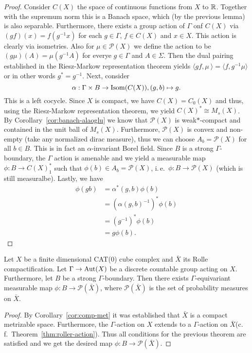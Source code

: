 \begin{proof}
  Consider \(C(X)\) the space of continuous functions from \(X\) to \(\mathbb{R}\). Together with the supremum norm this is a Banach space, which (by the previous lemma) is also separable. Furthermore, there exists a group action of \(\Gamma\) onf \(C(X)\) via \((gf)(x) = f(g^{-1}x)\) for each \(g \in \Gamma\), \(f \in C(X)\) and \(x \in X\). This action is clearly via isometries. Also for \(\mu \in \mathcal{P}(X)\) we define the action to be \((g\mu)(A) = \mu(g^{-1} A)\) for everye \(g \in \Gamma\) and \(A \in \Sigma\). Then the dual pairing established in the Riesz-Markow representation theorem yields \(\langle gf, \mu\ \rangle = \langle f, g^{-1} \mu \rangle\) or in other words \(g^\ast = g^{-1}\).
  Next, consider
  \[
    \alpha: \Gamma \times B \to \operatorname{Isom}(C(X)), (g, b) \mapsto g.
  \]
  This is a left cocycle.
  Since \(X\) is compact, we have \(C(X) = C_0(X)\) and thus, using the Riesz-Markow representation theorem, we yield \(C(X)^\ast \cong M_{s}(X)\). By Corollary~\ref{cor:banach-alaoglu} we know that \(\mathcal{P}(X)\) is weak\(\ast\)-compact and contained in the unit ball of \(M_s(X)\). Furthermore, \(\mathcal{P}(X)\) is convex and non-empty (take any normalized dirac measure), thus we can choose \(A_b = \mathcal{P}(X)\) for all \(b \in B\). This is in fact an \(\alpha\)-invariant Borel field. Since \(B\) is a strong \(\Gamma\)-boundary, the \(\Gamma\) action is amenable and we yield a measurable map \(\phi \colon B \to C(X)^\ast_1\) such that \(\phi(b) \in A_b = \mathcal{P}(X)\), i.\,e.\ \(\phi \colon B \to \mathcal{P}(X)\) (which is still measuralbe). Lastly, we have
  \begin{align*}
    \phi(gb) & = \alpha^\ast(g, b) \phi(b)\\
               & = \left(\alpha(g,b)^{-1}\right)^\ast \phi(b)\\
               & = \left ( g^{-1}\right)^\ast \phi(b)\\
               & = g\phi(b).
  \end{align*}
\end{proof}

\begin{cor}
  \label{cor:p(x)}
  Let \(X\) be a finite dimensional CAT(0) cube complex and \(\bar X\) its Rolle compactification. Let \(\Gamma \to \operatorname{Aut}(X)\) be a discrete countable group acting on \(X\). Furthermore, let \(B\) be a strong \(\Gamma\)-boundary. Then there exists \(\Gamma\)-equivariant measurable map \(\phi\colon B \to \mathcal{P}(\bar X)\), where \(\mathcal{P}(\bar X)\) is the set of probability measures on \(\bar X\).
\end{cor}

\begin{proof}
  By Corollary~\ref{cor:comp-met} it was established that \(\bar X\) is a compact metrizable space. Furthermore, the \(\Gamma\)-action on \(X\) extends to a \(\Gamma\)-action on \(\bar X\)(c.\,f.\ Theorem~\ref{thm:roller-action}). Thus all conditions for the previous theorem are satisfied and we get the desired map \(\phi\colon B \to \mathcal{P}(\bar X)\).
\end{proof}

